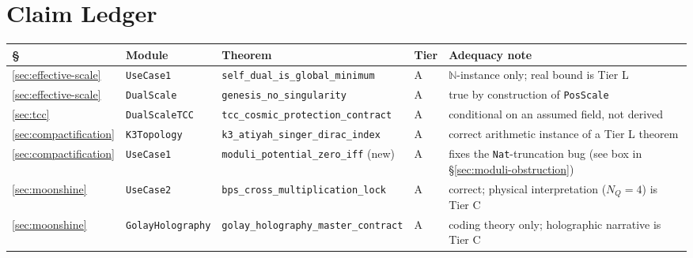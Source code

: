\documentclass[11pt,a4paper]{article}
\theoremstyle{remark}
\begin{document}
\section{Claim Ledger}
\label{app:ledger}

\begin{center}
\footnotesize
\begin{tabular}{@{}l l >{\raggedright\arraybackslash}p{4.4cm} l >{\raggedright\arraybackslash}p{4.0cm}@{}}
\toprule
\textbf{\S} & \textbf{Module} & \textbf{Theorem} & \textbf{Tier} & \textbf{Adequacy note} \\ \midrule
\ref{sec:effective-scale} & \texttt{UseCase1} & \texttt{self\_\discretionary{}{}{}dual\_\discretionary{}{}{}is\_\discretionary{}{}{}global\_\discretionary{}{}{}minimum} & A & $\mathbb{N}$-instance only; real bound is Tier L \\
\ref{sec:effective-scale} & \texttt{DualScale} & \texttt{genesis\_\discretionary{}{}{}no\_\discretionary{}{}{}singularity} & A & true by construction of \texttt{PosScale} \\
\ref{sec:tcc} & \texttt{DualScaleTCC} & \texttt{tcc\_\discretionary{}{}{}cosmic\_\discretionary{}{}{}protection\_\discretionary{}{}{}contract} & A & conditional on an assumed field, not derived \\
\ref{sec:compactification} & \texttt{K3Topology} & \texttt{k3\_\discretionary{}{}{}atiyah\_\discretionary{}{}{}singer\_\discretionary{}{}{}dirac\_\discretionary{}{}{}index} & A & correct arithmetic instance of a Tier L theorem \\
\ref{sec:compactification} & \texttt{UseCase1} & \texttt{moduli\_\discretionary{}{}{}potential\_\discretionary{}{}{}zero\_\discretionary{}{}{}iff} (new) & A & fixes the \texttt{Nat}-truncation bug (see box in \S\ref{sec:moduli-obstruction}) \\
\ref{sec:moonshine} & \texttt{UseCase2} & \texttt{bps\_\discretionary{}{}{}cross\_\discretionary{}{}{}multiplication\_\discretionary{}{}{}lock} & A & correct; physical interpretation ($N_Q=4$) is Tier C \\
\ref{sec:moonshine} & \texttt{GolayHolography} & \texttt{golay\_\discretionary{}{}{}holography\_\discretionary{}{}{}master\_\discretionary{}{}{}contract} & A & coding theory only; holographic narrative is Tier C \\

\end{tabular}
\end{center}
\end{document}
